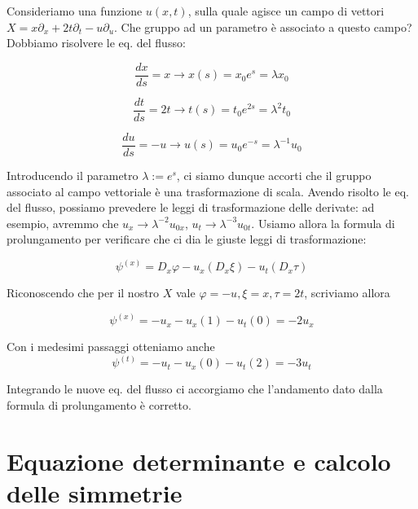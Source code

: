 \documentclass{report}
\begin{document}
\begin{example}
    Consideriamo una funzione $u(x, t)$, sulla quale agisce un campo di vettori $X = x\partial_x + 2t\partial_t -u\partial_u$. Che gruppo ad un parametro è associato a questo campo? Dobbiamo risolvere le eq. del flusso: 

    \begin{equation}
        \frac{dx}{ds} = x \rightarrow x(s) = x_0e^s = \lambda x_0
    \end{equation}

    \begin{equation}
        \frac{dt}{ds} = 2t \rightarrow t(s) = t_0e^{2s} = \lambda^2 t_0
    \end{equation}

    \begin{equation}
        \frac{du}{ds} = -u \rightarrow u(s) = u_0e^{-s} = \lambda^{-1}u_0
    \end{equation}

    Introducendo il parametro $\lambda := e^s$, ci siamo dunque accorti che il gruppo associato al campo vettoriale è una trasformazione di scala. Avendo risolto le eq. del flusso, possiamo prevedere le leggi di trasformazione delle derivate: ad esempio, avremmo che $u_x \rightarrow \lambda^{-2}u_{0x}$, $u_t \rightarrow \lambda^{-3}u_{0t}$. Usiamo allora la formula di prolungamento per verificare che ci dia le giuste leggi di trasformazione: 

    \begin{equation}
        \psi^{(x)} = D_x\varphi - u_x(D_x\xi) - u_t(D_x\tau)
    \end{equation}

    Riconoscendo che per il nostro $X$ vale $\varphi = -u, \xi = x, \tau = 2t$, scriviamo allora 

    \begin{equation}
        \psi^{(x)} = -u_x-u_x(1)-u_t(0) = -2u_x
    \end{equation}

    Con i medesimi passaggi otteniamo anche 
    \begin{equation}
        \psi^{(t)} = -u_t -u_x(0) - u_t(2) = -3u_t
    \end{equation}

    Integrando le nuove eq. del flusso ci accorgiamo che l'andamento dato dalla formula di prolungamento è corretto. 
\end{example}

\section{Equazione determinante e calcolo delle simmetrie}
\end{document}

